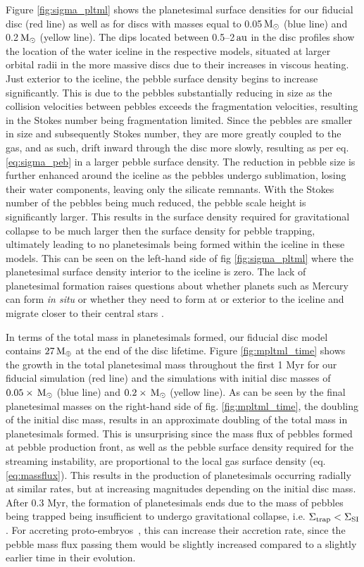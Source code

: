 \documentclass[a4paper,fleqn,usenatbib]{mnras}
\newcommand{\me}{{\, {\rm M}_{\oplus}}}
\newcommand{\msun}{{\, {\rm M}_{\odot}}}
\newcommand{\au}{{\, {\rm au}}}
\newcommand{\embs}{{{proto-embryos~}}}
\begin{document}
Figure \ref{fig:sigma_pltml} shows the planetesimal surface densities for our fiducial disc (red line) as well as for discs with masses equal to 0.05$\msun$ (blue line) and 0.2$\msun$ (yellow line).
The dips located between 0.5--2$\au$ in the disc profiles show the location of the water iceline in the respective models, situated at larger orbital radii in the more massive discs due to their increases in viscous heating.
Just exterior to the iceline, the pebble surface density begins to increase significantly.
This is due to the pebbles substantially reducing in size as the collision velocities between pebbles exceeds the fragmentation velocities, resulting in the Stokes number being fragmentation limited.
Since the pebbles are smaller in size and subsequently Stokes number, they are more greatly coupled to the gas, and as such, drift inward through the disc more slowly, resulting as per eq. \ref{eq:sigma_peb} in a larger pebble surface density.
The reduction in pebble size is further enhanced around the iceline as the pebbles undergo sublimation, losing their water components, leaving only the silicate remnants.
With the Stokes number of the pebbles being much reduced, the pebble scale height is significantly larger.
This results in the surface density required for gravitational collapse to be much larger then the surface density for pebble trapping, ultimately leading to no planetesimals being formed within the iceline in these models.
This can be seen on the left-hand side of fig \ref{fig:sigma_pltml} where the planetesimal surface density interior to the iceline is zero.
The lack of planetesimal formation raises questions about whether planets such as Mercury can form {\it{in situ}} or whether they need to form at or exterior to the iceline and migrate closer to their central stars \citep{Johansen21}.

In terms of the total mass in planetesimals formed, our fiducial disc model contains $27 \me$ at the end of the disc lifetime.
Figure \ref{fig:mpltml_time} shows the growth in the total planetesimal mass throughout the first 1 Myr for our fiducial simulation (red line) and the simulations with initial disc masses of $0.05 \times \msun$ (blue line) and $0.2 \times \msun$ (yellow line).
As can be seen by the final planetesimal masses on the right-hand side of fig. \ref{fig:mpltml_time}, the doubling of the initial disc mass, results in an approximate doubling of the total mass in planetesimals formed.
This is unsurprising since the mass flux of pebbles formed at pebble production front, as well as the pebble surface density required for the streaming instability, are proportional to the local gas surface density (eq. \ref{eq:massflux}).
This results in the production of planetesimals occurring radially at similar rates, but at increasing magnitudes depending on the initial disc mass.
After 0.3 Myr, the formation of planetesimals ends due to the mass of pebbles being trapped being insufficient to undergo gravitational collapse, i.e. $\Sigma_{\rm trap} < \Sigma_{\rm SI}$.
For accreting \embs, this can increase their accretion rate, since the pebble mass flux passing them would be slightly increased compared to a slightly earlier time in their evolution.
\end{document}
